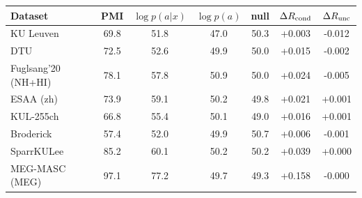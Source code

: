\begin{tabular}{lcccccc}\toprule
Dataset & PMI & $\log p(a|x)$ & $\log p(a)$ & null & $\Delta R_{\rm cond}$ & $\Delta R_{\rm unc}$ \\\midrule
KU Leuven & 69.8 & 51.8 & 47.0 & 50.3 & +0.003 & -0.012 \\
DTU & 72.5 & 52.6 & 49.9 & 50.0 & +0.015 & -0.002 \\
Fuglsang'20 (NH+HI) & 78.1 & 57.8 & 50.9 & 50.0 & +0.024 & -0.005 \\
ESAA (zh) & 73.9 & 59.1 & 50.2 & 49.8 & +0.021 & +0.001 \\
KUL-255ch & 66.8 & 55.4 & 50.1 & 49.0 & +0.016 & +0.001 \\
Broderick & 57.4 & 52.0 & 49.9 & 50.7 & +0.006 & -0.001 \\
SparrKULee & 85.2 & 60.1 & 50.2 & 50.2 & +0.039 & +0.000 \\
MEG-MASC (MEG) & 97.1 & 77.2 & 49.7 & 49.3 & +0.158 & -0.000 \\
\bottomrule\end{tabular}

